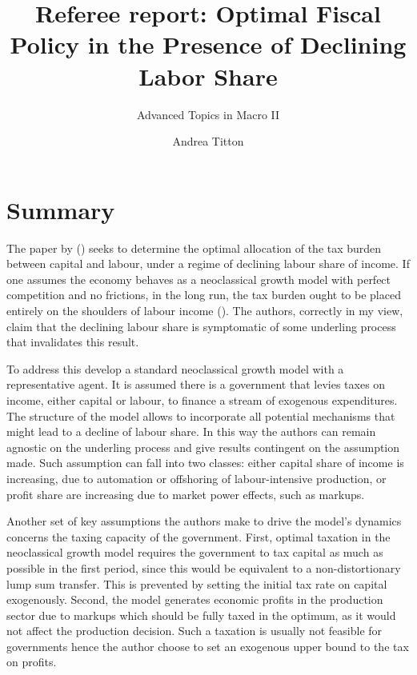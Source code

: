 \documentclass[american]{scrartcl}
\title{Referee report: Optimal Fiscal Policy in the Presence of Declining Labor Share}
\subtitle{Advanced Topics in Macro II}
\author{Andrea Titton}
\newcommand{\citein}[1]{\citeauthor{#1} (\citeyear{#1})}
\begin{document}

\maketitle


\section{Summary}

The paper by \citein{Atesagaoglu2020} seeks to determine the optimal allocation of the tax burden between capital and labour, under a regime of declining labour share of income. If one assumes the economy behaves as a neoclassical growth model with perfect competition and no frictions, in the long run, the tax burden ought to be placed entirely on the shoulders of labour income (\cite{Ramsey1928, Judd1985, Chamley1986}). The authors, correctly in my view, claim that the declining labour share is symptomatic of some underling process that invalidates this result.

To address this \citeauthor{Atesagaoglu2020} develop a standard neoclassical growth model with a representative agent. It is assumed there is a government that levies taxes on income, either capital or labour, to finance a stream of exogenous expenditures. The structure of the model allows to incorporate all potential mechanisms that might lead to a decline of labour share. In this way the authors can remain agnostic on the underling process and give results contingent on the assumption made. Such assumption can fall into two classes: either capital share of income is increasing, due to automation or offshoring of labour-intensive production, or profit share are increasing due to market power effects, such as markups.

Another set of key assumptions the authors make to drive the model's dynamics concerns the taxing capacity of the government. First, optimal taxation in the neoclassical growth model requires the government to tax capital as much as possible in the first period, since this would be equivalent to a non-distortionary lump sum transfer. This is prevented by setting the initial tax rate on capital exogenously. Second, the model generates economic profits in the production sector due to markups which should be fully taxed in the optimum, as it would not affect the production decision. Such a taxation is usually not feasible for governments hence the author choose to set an exogenous upper bound to the tax on profits.
\end{document}
